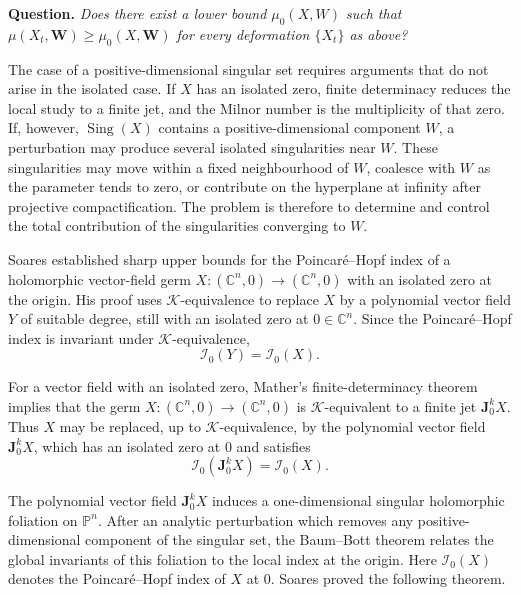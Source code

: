 \documentclass[10pt,twoside]{amsart}
\numberwithin{equation}{section}
\theoremstyle{definition}
\theoremstyle{remark}
\DeclareMathOperator{\sing}{Sing}
\newcommand{\C}{\mathbb{C}}
\newcommand{\W}{\mathbf{W}}
\begin{document}
\begin{center}
\textbf{Question.} \textit{Does there exist a lower bound $\mu_0(X,W)$ such that
$\mu(X_t,\W)\geq\mu_0(X,\W)$ for every deformation $\{X_t\}$ as above?}
\end{center}

The case of a positive-dimensional singular set requires arguments that do not arise in the isolated case. If $X$ has an isolated zero, finite determinacy reduces the local study to a finite jet, and the Milnor number is the multiplicity of that zero. If, however, $\sing(X)$ contains a positive-dimensional component $W$, a perturbation may produce several isolated singularities near $W$. These singularities may move within a fixed neighbourhood of $W$, coalesce with $W$ as the parameter tends to zero, or contribute on the hyperplane at infinity after projective compactification. The problem is therefore to determine and control the total contribution of the singularities converging to $W$.

\noindent
Soares \cite{MGS} established sharp upper bounds for the Poincar\'e--Hopf index of a holomorphic vector-field germ $X:(\C^n,0)\to(\C^n,0)$ with an isolated zero at the origin. His proof uses $\mathcal K$-equivalence to replace $X$ by a polynomial vector field $Y$ of suitable degree, still with an isolated zero at $0\in\C^n$. Since the Poincar\'e--Hopf index is invariant under $\mathcal K$-equivalence,
\[
\mathcal I_0(Y)=\mathcal I_0(X).
\]

For a vector field with an isolated zero, Mather's finite-determinacy theorem implies that the germ $X:(\C^n,0)\to(\C^n,0)$ is $\mathcal K$-equivalent to a finite jet $\mathbf J_0^kX$. Thus $X$ may be replaced, up to $\mathcal K$-equivalence, by the polynomial vector field $\mathbf J_0^kX$, which has an isolated zero at $0$ and satisfies
\[
\mathcal I_0(\mathbf J_0^kX)=\mathcal I_0(X).
\]

The polynomial vector field $\mathbf J_0^kX$ induces a one-dimensional singular holomorphic foliation on $\mathbb P^n$. After an analytic perturbation which removes any positive-dimensional component of the singular set, the Baum--Bott theorem relates the global invariants of this foliation to the local index at the origin. Here $\mathcal I_0(X)$ denotes the Poincar\'e--Hopf index of $X$ at $0$. Soares proved the following theorem.
\end{document}
